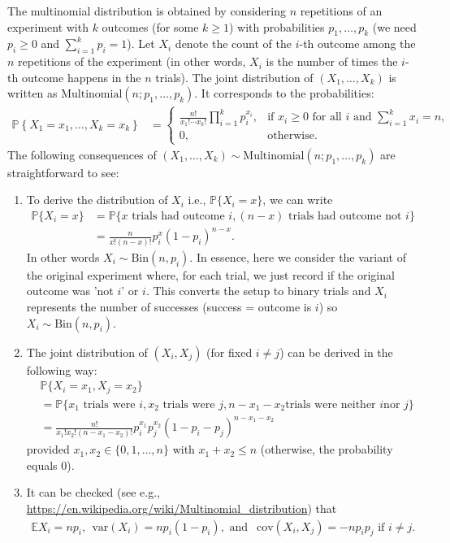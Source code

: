 \documentclass{scrartcl}
\newcommand{\E}{{\mathbb E}}
\renewcommand{\P}{{\mathbb P}}
\begin{document}
The multinomial distribution is obtained by considering $n$
repetitions of an experiment with $k$ outcomes (for some $k \geq 1$)
with probabilities $p_1, \dots, p_k$ (we need $p_i \geq 0$ and
$\sum_{i=1}^kp_i = 1$). Let $X_i$ denote the count of the $i$-th
outcome among the $n$ repetitions of the experiment (in other words,
$X_i$ is the number of times the $i$-th outcome happens in the $n$
trials). The joint distribution of $(X_1, \dots, X_k)$ is written as
$\text{Multinomial}(n; p_1, \dots, p_k)$. It corresponds to the
probabilities:
\begin{align*}
\P\!\left\{ X_1 = x_1, \ldots, X_k = x_k \right\}
&=
\begin{cases}
\displaystyle
\frac{n!}{x_1! \cdots x_k!}
\prod_{i=1}^k p_i^{x_i},
& \text{if } x_i \ge 0 \text{ for all } i
\text{ and } \sum_{i=1}^k x_i = n, \\
0, & \text{otherwise}.
\end{cases}
\end{align*}
The following consequences of $(X_1, \dots, X_k) \sim
\text{Multinomial}(n; p_1, \dots, p_k)$ are straightforward to see:
\begin{enumerate}
\item To derive the distribution of $X_i$ i.e., $\P\{X_i = x\}$, we
  can write
  \begin{align*}
    \P\{X_i = x\} &= \P\{x \text{ trials had outcome } i, (n-x)
                    \text{ trials had outcome not } i \} \\
    &= \frac{n}{x! (n-x)!} p_i^{x} (1 - p_i)^{n-x}. 
  \end{align*}
  In other words $X_i \sim \text{Bin}(n, p_i)$. In essence, here we
  consider the variant of the original experiment where, for each 
  trial, we just record if the original outcome was 'not
  $i$' or $i$. This converts the setup to binary trials and $X_i$
  represents the number of successes (success = outcome is $i$) so
  $X_i \sim \text{Bin}(n, p_i)$. 
\item The joint distribution of $(X_i, X_j)$ (for fixed $i \neq j$)
  can be derived in the following way:
  \begin{align*}
   & \P\{X_i = x_1, X_j = x_2\} \\ &= \P\{x_1 \text{ trials were } i, x_2
                    \text{ trials were } j, n-x_1-x_2 \text{
                                 trials were neither } i \text{
                                     nor } j \}\\
    &= \frac{n!}{x_1! x_2!(n - x_1 - x_2)!} p_i^{x_1} p_j^{x_2} (1 -
      p_i - p_j)^{n-x_1-x_2}
  \end{align*}
  provided $x_1, x_2 \in \{0, 1, \dots, n\}$ with $x_1 + x_2 \leq n$
  (otherwise, the probability equals 0).
\item It can be checked (see e.g.,
  \url{https://en.wikipedia.org/wiki/Multinomial_distribution}) that 
\begin{align*}
  \E X_i = n p_i, ~~ \text{var}(X_i) = np_i(1 - p_i), \text{ and } ~~ \text{cov}(X_i,
  X_j) = -np_i p_j \text{ if } i \neq j. 
\end{align*}
\end{enumerate}
\end{document}
